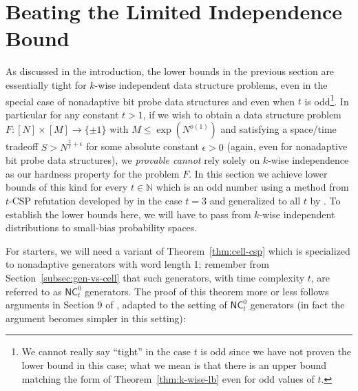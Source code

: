 \documentclass[11pt]{article}
\begin{document}
\section{Beating the Limited Independence Bound}\label{sec:nonadaptive-lbs}
As discussed in the introduction, the lower bounds in the previous section are essentially tight for $k$-wise independent data structure problems, even in the special case of nonadaptive bit probe data structures and even when $t$ is odd\footnote{We cannot really say ``tight'' in the case $t$ is odd since we have not proven the lower bound in this case; what we mean is that there is an upper bound matching the form of Theorem~\ref{thm:k-wise-lb} even for odd values of $t$.}. In particular for any constant $t > 1$, if we wish to obtain a data structure problem $F: [N] \times [M] \to \{\pm 1\}$ with $M \leq \exp(N^{o(1)})$ and satisfying a space/time tradeoff $S> N^{\frac{2}{t} + \epsilon}$ for some absolute constant $\epsilon > 0$ (again, even for nonadaptive bit probe data structures), we \emph{provable cannot} rely solely on $k$-wise independence as our hardness property for the problem $F$. In this section we achieve lower bounds of this kind for every $t \in \mathbb{N}$ which is an odd number using a method from $t$-CSP refutation developed by \cite{FKO} in the case $t=3$ and generalized to all $t$ by \cite{smoothed}. To establish the lower bounds here, we will have to pass from $k$-wise independent distributions to small-bias probability spaces. 

For starters, we will need a variant of Theorem~\ref{thm:cell-csp} which is specialized to nonadaptive generators with word length 1; remember from Section~\ref{subsec:gen-vs-cell} that such generators, with time complexity $t$, are referred to as $\mathsf{NC}^0_t$ generators. The proof of this theorem more or less follows arguments in Section 9 of \cite{smoothed}, adapted to the setting of $\mathsf{NC}^0_t$ generators (in fact the argument becomes simpler in this setting):
\end{document}
